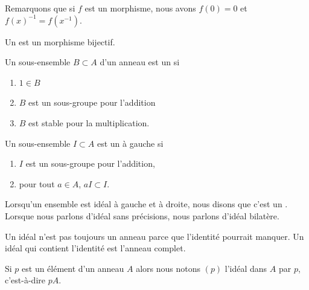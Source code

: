 Remarquons que si \( f\) est un morphisme, nous avons \( f(0)=0\) et \( f(x)^{-1}=f(x^{-1})\).

\begin{definition}
    Un  est un morphisme bijectif.
\end{definition}

\begin{definition}  \label{DefAJVTPxb}
    Un sous-ensemble \( B\subset A\) d'un anneau est un  si
    \begin{enumerate}
        \item
            \( 1\in B\)
        \item
            \( B\) est un sous-groupe pour l'addition
        \item
            \( B\) est stable pour la multiplication.
    \end{enumerate}
\end{definition}

\begin{definition}  \label{DefooQULAooREUIU}
    Un sous-ensemble \( I\subset A\) est un  à gauche si
    \begin{enumerate}
        \item
            \( I\) est un sous-groupe pour l'addition,
        \item
            pour tout \( a\in A\), \( aI\subset I\).
    \end{enumerate}

    Lorsqu'un ensemble est idéal à gauche et à droite, nous disons que c'est un . Lorsque nous parlons d'idéal sans précisions, nous parlons d'idéal bilatère.
\end{definition}

\begin{remark}
    Un idéal n'est pas toujours un anneau parce que l'identité pourrait manquer. Un idéal qui contient l'identité est l'anneau complet.
\end{remark}

\begin{definition}  \label{DefSKTooOTauAR}
    Si \( p\) est un élément d'un anneau \( A\) alors nous notons \( (p)\) l'idéal dans \( A\)  par \( p\), c'est-à-dire \( pA\).
\end{definition}


